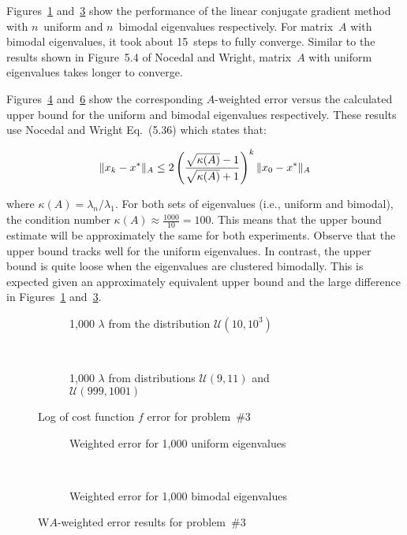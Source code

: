 Figures~\ref{fig:p03:uniformEigenvalues} and~\ref{fig:p03:bimodalEigenvalues} show the performance of the linear conjugate gradient method with $n$~uniform and $n$~bimodal eigenvalues respectively.  For matrix~$A$ with bimodal eigenvalues, it took about 15~steps to fully converge. Similar to the results shown in Figure~5.4 of Nocedal and Wright, matrix~$A$ with uniform eigenvalues takes longer to converge. 

Figures~\ref{fig:p03:uniformWeightedErr} and~\ref{fig:p03:bimodalWeightedErr} show the corresponding $A$-weighted error versus the calculated upper bound for the uniform and bimodal eigenvalues respectively.  These results use Nocedal and Wright Eq.~(5.36) which states that:

\[ \lVert x_k - x^{*}\rVert_{A} \leq 2\left(\frac{\sqrt{\kappa(A)}-1}{\sqrt{\kappa(A)}+1}\right)^{k}\lVert x_0 - x^{*}\rVert_{A} \]

\noindent
where $\kappa(A)=\lambda_n / \lambda_1$. For both sets of eigenvalues (i.e., uniform and bimodal), the condition number ${\kappa(A) \approx \frac{1000}{10} = 100}$.  This means that the upper bound estimate will be approximately the same for both experiments.  Observe that the upper bound tracks well for the uniform eigenvalues.  In contrast, the upper bound is quite loose when the eigenvalues are clustered bimodally.  This is expected given an approximately equivalent upper bound and the large difference in Figures~\ref{fig:p03:uniformEigenvalues} and~\ref{fig:p03:bimodalEigenvalues}.

\newpage
\begin{figure}[p]
  \centering
  \begin{subfigure}[t]{0.45\textwidth}
    \centering
    
    \caption{\scriptsize 1,000 $\lambda$ from the distribution $\mathcal{U}(10,10^{3})$}\label{fig:p03:uniformEigenvalues}
  \end{subfigure}
  ~
  \begin{subfigure}[t]{0.45\textwidth}
    \centering
    
    \caption{\scriptsize 1,000 $\lambda$ from distributions $\mathcal{U}(9,11)$ and $\mathcal{U}(999,1001)$ }\label{fig:p03:bimodalEigenvalues}
  \end{subfigure}
  \caption{Log of cost function $f$ error for problem~\#3}
\end{figure}

\begin{figure}[p]
  \centering
  \begin{subfigure}[t]{0.45\textwidth}
    \centering
    
    \caption{\scriptsize Weighted error for 1,000 uniform eigenvalues}\label{fig:p03:uniformWeightedErr}
  \end{subfigure}
  ~
  \begin{subfigure}[t]{0.45\textwidth}
    \centering
    
    \caption{\scriptsize Weighted error for 1,000 bimodal eigenvalues}\label{fig:p03:bimodalWeightedErr}
  \end{subfigure}
  \caption{W$A$-weighted error results for problem~\#3}
\end{figure}
\clearpage